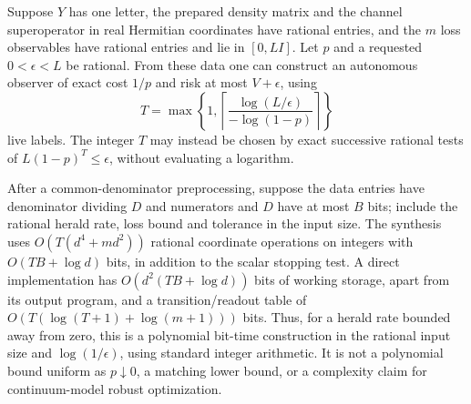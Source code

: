 \begin{theorem}\label{thm:boundary-algorithm}
Suppose $Y$ has one letter, the prepared density matrix and the channel superoperator in real Hermitian coordinates have rational entries, and the $m$ loss observables have rational entries and lie in $[0,LI]$. Let $p$ and a requested $0<\epsilon<L$ be rational. From these data one can construct an autonomous observer of exact cost $1/p$ and risk at most $V+\epsilon$, using
\[
 T=\max\left\{1,\left\lceil\frac{\log(L/\epsilon)}{-\log(1-p)}\right\rceil\right\}
\]
live labels. The integer $T$ may instead be chosen by exact successive rational tests of $L(1-p)^T\le\epsilon$, without evaluating a logarithm.

After a common-denominator preprocessing, suppose the data entries have denominator dividing $D$ and numerators and $D$ have at most $B$ bits; include the rational herald rate, loss bound and tolerance in the input size. The synthesis uses $O(T(d^4+md^2))$ rational coordinate operations on integers with $O(TB+\log d)$ bits, in addition to the scalar stopping test. A direct implementation has $O(d^2(TB+\log d))$ bits of working storage, apart from its output program, and a transition/readout table of $O(T(\log(T+1)+\log(m+1)))$ bits. Thus, for a herald rate bounded away from zero, this is a polynomial bit-time construction in the rational input size and $\log(1/\epsilon)$, using standard integer arithmetic. It is not a polynomial bound uniform as $p\downarrow0$, a matching lower bound, or a complexity claim for continuum-model robust optimization.
\end{theorem}
